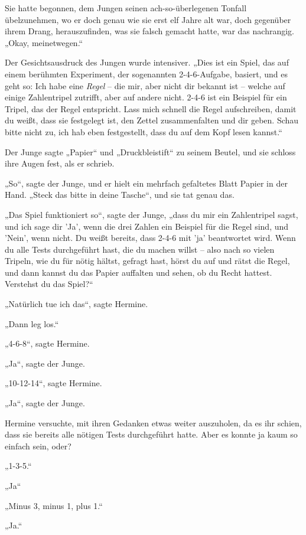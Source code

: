 Sie hatte begonnen, dem Jungen seinen ach-so-überlegenen Tonfall übelzunehmen, wo er doch genau wie sie erst elf Jahre alt war, doch gegenüber ihrem Drang, herauszufinden, was sie falsch gemacht hatte, war das nachrangig. „Okay, meinetwegen.“ 

Der Gesichtsausdruck des Jungen wurde intensiver. „Dies ist ein Spiel, das auf einem berühmten Experiment, der sogenannten 2-4-6-Aufgabe, basiert, und es geht so: Ich habe eine \emph{Regel} – die mir, aber nicht dir bekannt ist – welche auf einige Zahlentripel zutrifft, aber auf andere nicht. 2-4-6 ist ein Beispiel für ein Tripel, das der Regel entspricht. Lass mich schnell die Regel aufschreiben, damit du weißt, dass sie festgelegt ist, den Zettel zusammenfalten und dir geben. Schau bitte nicht zu, ich hab eben festgestellt, dass du auf dem Kopf lesen kannst.“ 

Der Junge sagte „Papier“ und „Druckbleistift“ zu seinem Beutel, und sie schloss ihre Augen fest, als er schrieb. 

„So“, sagte der Junge, und er hielt ein mehrfach gefaltetes Blatt Papier in der Hand. „Steck das bitte in deine Tasche“, und sie tat genau das. 

„Das Spiel funktioniert so“, sagte der Junge, „dass du mir ein Zahlentripel sagst, und ich sage dir 'Ja', wenn die drei Zahlen ein Beispiel für die Regel sind, und 'Nein', wenn nicht. Du weißt bereits, dass 2-4-6 mit 'ja' beantwortet wird. Wenn du alle Tests durchgeführt hast, die du machen willst – also nach so vielen Tripeln, wie du für nötig hältst, gefragt hast, hörst du auf und rätst die Regel, und dann kannst du das Papier auffalten und sehen, ob du Recht hattest. Verstehst du das Spiel?“ 

„Natürlich tue ich das“, sagte Hermine. 

„Dann leg los.“ 

„4-6-8“, sagte Hermine. 

„Ja“, sagte der Junge. 

„10-12-14“, sagte Hermine. 

„Ja“, sagte der Junge. 

Hermine versuchte, mit ihren Gedanken etwas weiter auszuholen, da es ihr schien, dass sie bereits alle nötigen Tests durchgeführt hatte. Aber es konnte ja kaum so einfach sein, oder? 

„1-3-5.“ 

„Ja“ 

„Minus 3, minus 1, plus 1.“ 

„Ja.“ 

